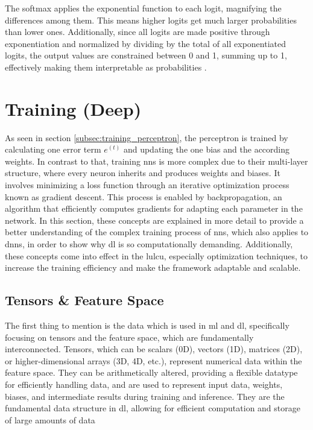 The softmax applies the exponential function to each logit, magnifying the differences among them. This means higher logits get much larger probabilities than lower ones. Additionally, since all logits are made positive through exponentiation and normalized by dividing by the total of all exponentiated logits, the output values are constrained between 0 and 1, summing up to 1, effectively making them interpretable as probabilities \autocite{Nielsen2015,Szeliski2022,Zhang.Lipton.ea2023}.

\section{Training (Deep) }
\label{subsec:training}

As seen in section \ref{subsec:training_perceptron}, the perceptron is trained by calculating one error term \( e^{(t)} \) and updating the one bias and the according weights. In contrast to that, training \glspl{nn} is more complex due to their multi-layer structure, where every neuron inherits and produces weights and biases. It involves minimizing a loss function through an iterative optimization process known as gradient descent. This process is enabled by backpropagation, an algorithm that efficiently computes gradients for adapting each parameter in the network. In this section, these concepts are explained in more detail to provide a better understanding of the complex training process of \glspl{nn}, which also applies to \glspl{dnn}, in order to show why \gls{dl} is so computationally demanding. Additionally, these concepts come into effect in the \gls{lulcu}, especially optimization techniques, to increase the training efficiency and make the framework adaptable and scalable. 

\subsection{Tensors \& Feature Space}    

The first thing to mention is the data which is used in \gls{ml} and \gls{dl}, specifically focusing on tensors and the feature space, which are fundamentally interconnected. Tensors, which can be scalars (0D), vectors (1D), matrices (2D), or higher-dimensional arrays (3D, 4D, etc.), represent numerical data within the feature space. They can be arithmetically altered, providing a flexible datatype for efficiently handling data, and are used to represent input data, weights, biases, and intermediate results during training and inference. They are the fundamental data structure in \gls{dl}, allowing for efficient computation and storage of large amounts of data \autocite{Goodfellow.Bengio.ea2016,Zhang.Lipton.ea2023}


